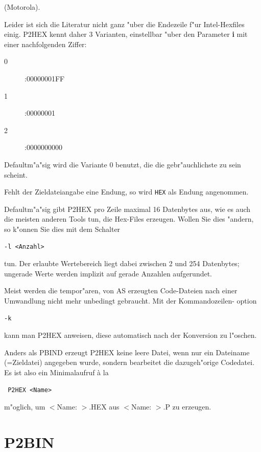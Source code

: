 \documentclass[12pt,a4paper,twoside]{report}
\newcommand{\bb}[1]{{\bf #1}}
\newcommand{\tty}[1]{{\tt #1}}
\newcommand{\asname}{AS}
\begin{document}
(Motorola).
\par
Leider ist sich die Literatur nicht ganz "uber die Endezeile f"ur
Intel-Hexfiles einig.  P2HEX kennt daher 3 Varianten, einstellbar "uber
den Parameter \bb{i} mit einer nachfolgenden Ziffer:
\begin{description}
\item[0]{ :00000001FF}
\item[1]{ :00000001}
\item[2]{ :0000000000}
\end{description}
\par
Defaultm"a"sig wird die Variante 0 benutzt, die die gebr"auchlichste zu
sein scheint.
\par
Fehlt der Zieldateiangabe eine Endung, so wird \tty{HEX} als Endung angenommen.
\par
Defaultm"a"sig gibt P2HEX pro Zeile maximal 16 Datenbytes aus, wie es
auch die meisten anderen Tools tun, die Hex-Files erzeugen.  Wollen
Sie dies "andern, so k"onnen Sie dies mit dem Schalter
\begin{verbatim}
-l <Anzahl>
\end{verbatim}
tun.  Der erlaubte Wertebereich liegt dabei zwischen 2 und 254 Datenbytes;
ungerade Werte werden implizit auf gerade Anzahlen aufgerundet.
\par
Meist werden die tempor"aren, von \asname{} erzeugten Code-Dateien nach einer
Umwandlung nicht mehr unbedingt gebraucht.  Mit der Kommandozeilen-
option
\begin{verbatim}
-k
\end{verbatim}
kann man P2HEX anweisen, diese automatisch nach der Konversion zu l"oschen.
\par
Anders als PBIND erzeugt P2HEX keine leere Datei, wenn nur ein Dateiname
(=Zieldatei) angegeben wurde, sondern bearbeitet die dazugeh"orige
Codedatei.  Es ist also ein Minimalaufruf \`a la
\begin{verbatim}
 P2HEX <Name>
\end{verbatim}
m"oglich, um $<$Name:  $>$.HEX aus $<$Name:  $>$.P zu erzeugen.


\section{P2BIN}
\end{document}
